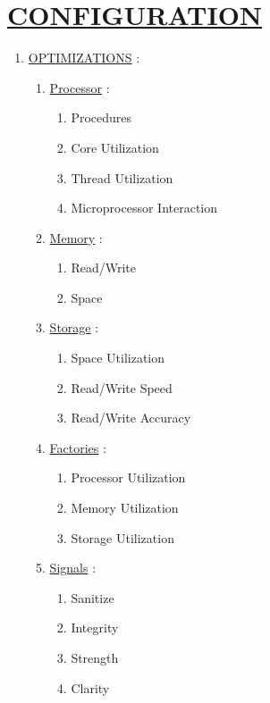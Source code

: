 \documentclass[11pt]{article}
\begin{document}
\section*{\ul{CONFIGURATION}}
\begin{enumerate}
	
	\item[] \ul{OPTIMIZATIONS} :
	\begin{enumerate}
		\item[] \ul{Processor}  :
		\begin{enumerate}
			\item[] Procedures
			\item[] Core Utilization
			\item[] Thread Utilization
			\item[] Microprocessor Interaction
		\end{enumerate}
	
		\item[] \ul{Memory}  :
		\begin{enumerate}
			\item[] Read/Write
			\item[] Space
		\end{enumerate}
	
		\item[] \ul{Storage}  :
		\begin{enumerate}
			\item[] Space Utilization
			\item[] Read/Write Speed
			\item[] Read/Write Accuracy
		\end{enumerate}
	
		\item[] \ul{Factories} :
		\begin{enumerate}
			\item[] Processor Utilization
			\item[] Memory Utilization
			\item[] Storage Utilization
		\end{enumerate}
	
		\item[] \ul{Signals} :
		\begin{enumerate}
			\item[] Sanitize
			\item[] Integrity
			\item[] Strength
			\item[] Clarity
		\end{enumerate}
			

\end{enumerate}
\end{enumerate}
\end{document}
